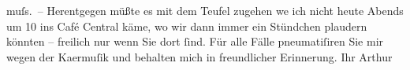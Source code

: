 \begin{ledgroupsized}[t]{13cm}
                    muſs. –\pend
           \pstart
           Herentgegen müßte es mit dem Teufel zugehen {\pb}we{\geminationn} ich nicht heute Abends um 10 ins
                        Café Central käme, wo wir dann immer ein
                    Stündchen plaudern könnten – freilich nur wenn Sie dort ſind. Für alle Fälle
                    pneumatiſiren Sie mir wegen der Ka{\geminationm}ermuſik und
                    behalten mich in freundlicher Erinnerung.\pend
           \pstart Ihr \spacefill\mbox{Arthur}\pend{}\endnumbering{}\end{ledgroupsized}  \newcommand{\dateiname}{L00294}\newcommand{\titel}{Arthur Schnitzler an Hugo von Hofmannsthal, [18. 1. 1894]}\newcommand{\editorInnen}{Martin Anton Müller und Gerd-Hermann Susen}
      